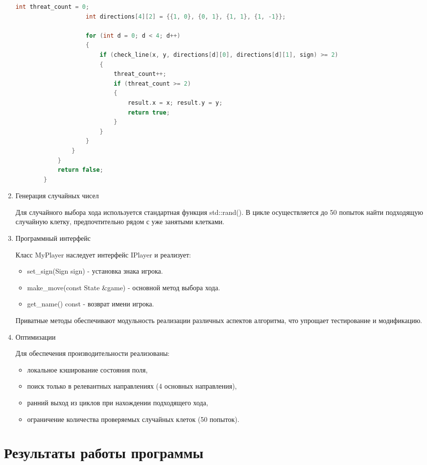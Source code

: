 \documentclass[a4paper]{article}
\begin{document}
\begin{enumerate}
\begin{lstlisting}[language=C++, caption={Функция поиска двойной угрозы}]
					int threat_count = 0;
					int directions[4][2] = {{1, 0}, {0, 1}, {1, 1}, {1, -1}};
					
					for (int d = 0; d < 4; d++)
					{
						if (check_line(x, y, directions[d][0], directions[d][1], sign) >= 2)
						{
							threat_count++;
							if (threat_count >= 2)
							{
								result.x = x; result.y = y;
								return true;
							}
						}
					}
				}
			}
			return false;
		}
	\end{lstlisting}
	
	\item Генерация случайных чисел
	
	Для случайного выбора хода используется стандартная функция std::rand(). В цикле осуществляется до 50 попыток найти подходящую случайную клетку, предпочтительно рядом с уже занятыми клетками.
	
	\item Программный интерфейс
	
	Класс MyPlayer наследует интерфейс IPlayer и реализует:
	
	\begin{itemize}
		\item set\_sign(Sign sign) - установка знака игрока.
		\item make\_move(const State \&game) - основной метод выбора хода.
		\item get\_name() const - возврат имени игрока.
	\end{itemize}
	Приватные методы обеспечивают модульность реализации различных аспектов алгоритма, что упрощает тестирование и модификацию.
	
	\item Оптимизации
	
	Для обеспечения производительности реализованы:
	
	\begin{itemize}
		\item локальное кэширование состояния поля,
		\item поиск только в релевантных направлениях (4 основных направления),
		\item ранний выход из циклов при нахождении подходящего хода,
		\item ограничение количества проверяемых случайных клеток (50 попыток).
	\end{itemize}
	
\end{enumerate} 
\clearpage

\section{Результаты работы программы}
\end{document}
